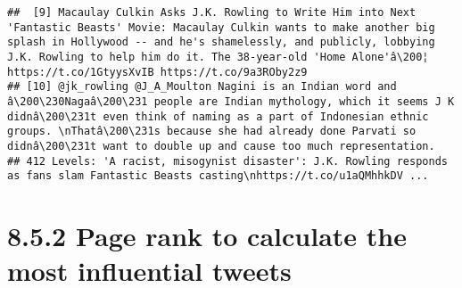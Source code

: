 \documentclass[]{article}
\begin{document}
\begin{verbatim}
##  [9] Macaulay Culkin Asks J.K. Rowling to Write Him into Next 'Fantastic Beasts' Movie: Macaulay Culkin wants to make another big splash in Hollywood -- and he's shamelessly, and publicly, lobbying J.K. Rowling to help him do it. The 38-year-old 'Home Alone'â\200¦ https://t.co/1GtyysXvIB https://t.co/9a3ROby2z9                                      
## [10] @jk_rowling @J_A_Moulton Nagini is an Indian word and â\200\230Nagaâ\200\231 people are Indian mythology, which it seems J K didnâ\200\231t even think of naming as a part of Indonesian ethnic groups. \nThatâ\200\231s because she had already done Parvati so didnâ\200\231t want to double up and cause too much representation.                                                
## 412 Levels: 'A racist, misogynist disaster': J.K. Rowling responds as fans slam Fantastic Beasts casting\nhttps://t.co/u1aQMhhkDV ...
\end{verbatim}

\section{8.5.2 Page rank to calculate the most influential
tweets}\label{page-rank-to-calculate-the-most-influential-tweets}
\end{document}
